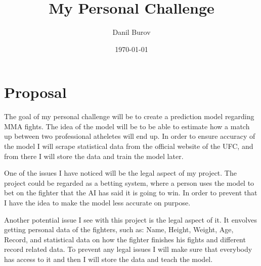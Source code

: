 \documentclass{article}
\title{My Personal Challenge}
\author{Danil Burov}
\date{\today}
\begin{document}
\maketitle

\section{Proposal}


The goal of my personal challenge will be to create a prediction model regarding MMA fights.
The idea of the model will be to be able to estimate how a match up between two professional atheletes
will end up. In order to ensure accuracy of the model I will scrape statistical data from the official website of the UFC,
and from there I will store the data and train the model later. 

One of the issues I have noticed will be the legal aspect of my project. The project could be regarded as a betting system, where a person
uses the model to bet on the fighter that the AI has said it is going to win. In order to prevent that I have the idea to make the model
less accurate on purpose.

Another potential issue I see with this project is the legal aspect of it. It envolves getting personal data of the fighters, such as: Name, Height, Weight, Age, 
Record, and statistical data on how the fighter finishes his fights and different record related data. To prevent any legal issues I will make sure that everybody has access
to it and then I will store the data and teach the model.
\end{document}
